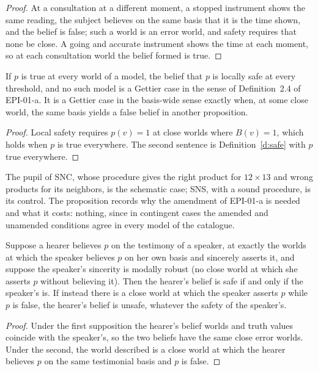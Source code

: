 \documentclass{situationist-preprint}
\begin{document}
\begin{proof}
At a consultation at a different moment, a stopped instrument shows the same reading, the subject believes on the same basis that it is the time shown, and the belief is false; such a world is an error world, and safety requires that none be close. A going and accurate instrument shows the time at each moment, so at each consultation world the belief formed is true.
\end{proof}

\begin{proposition}\label{p:nec}
If $p$ is true at every world of a model, the belief that $p$ is locally safe at every threshold, and no such model is a Gettier case in the sense of Definition~2.4 of EPI-01-a. It is a Gettier case in the basis-wide sense exactly when, at some close world, the same basis yields a false belief in another proposition.
\end{proposition}

\begin{proof}
Local safety requires $p(v) = 1$ at close worlds where $B(v) = 1$, which holds when $p$ is true everywhere. The second sentence is Definition~\ref{d:safe} with $p$ true everywhere.
\end{proof}

The pupil of SNC, whose procedure gives the right product for $12 \times 13$ and wrong products for its neighbors, is the schematic case; SNS, with a sound procedure, is its control. The proposition records why the amendment of EPI-01-a is needed and what it costs: nothing, since in contingent cases the amended and unamended conditions agree in every model of the catalogue.

\begin{proposition}[Testimony]\label{p:testimony}
Suppose a hearer believes $p$ on the testimony of a speaker, at exactly the worlds at which the speaker believes $p$ on her own basis and sincerely asserts it, and suppose the speaker's sincerity is modally robust (no close world at which she asserts $p$ without believing it). Then the hearer's belief is safe if and only if the speaker's is. If instead there is a close world at which the speaker asserts $p$ while $p$ is false, the hearer's belief is unsafe, whatever the safety of the speaker's.
\end{proposition}

\begin{proof}
Under the first supposition the hearer's belief worlds and truth values coincide with the speaker's, so the two beliefs have the same close error worlds. Under the second, the world described is a close world at which the hearer believes $p$ on the same testimonial basis and $p$ is false.
\end{proof}
\end{document}
